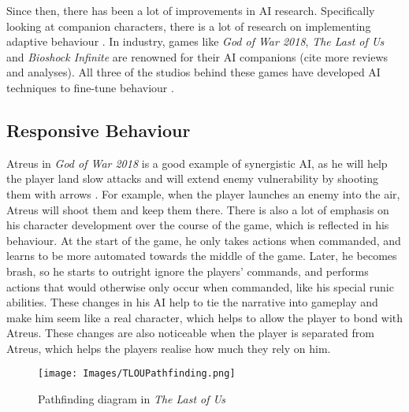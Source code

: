 \documentclass{IEEEtran}
\begin{document}
Since then, there has been a lot of improvements in AI research. Specifically looking at companion characters, there is a lot of research on implementing adaptive behaviour \cite{tremblay2013adaptive, CompanionBotsFPS2019, GeneratingCollabBehaviourPlanRecognition2016}. In industry, games like \textit{God of War 2018}, \textit{The Last of Us} and \textit{Bioshock Infinite} are renowned for their AI companions \cite{PlayDontShow} (cite more reviews and analyses). All three of the studios behind these games have developed AI techniques to fine-tune behaviour \cite{GDCAtreus, GAIP2EllieAI, GDCElizabeth, AIGamesBioshockAI}.

\subsection{Responsive Behaviour}
\label{Responsive Behaviour}

Atreus in \textit{God of War 2018} is a good example of synergistic AI, as he will help the player land slow attacks and will extend enemy vulnerability by shooting them with arrows \cite{GDCAtreus}. For example, when the player launches an enemy into the air, Atreus will shoot them and keep them there. There is also a lot of emphasis on his character development over the course of the game, which is reflected in his behaviour. At the start of the game, he only takes actions when commanded, and learns to be more automated towards the middle of the game. Later, he becomes brash, so he starts to outright ignore the players’ commands, and performs actions that would otherwise only occur when commanded, like his special runic abilities. These changes in his AI help to tie the narrative into gameplay and make him seem like a real character, which helps to allow the player to bond with Atreus. These changes are also noticeable when the player is separated from Atreus, which helps the players realise how much they rely on him.

\begin{figure}
  \centering
  \texttt{[image: Images/TLOUPathfinding.png]}
  
\caption{Pathfinding diagram in \textit{The Last of Us}}
\label{fig:TLOUPathfinding}
\end{figure}
\end{document}
